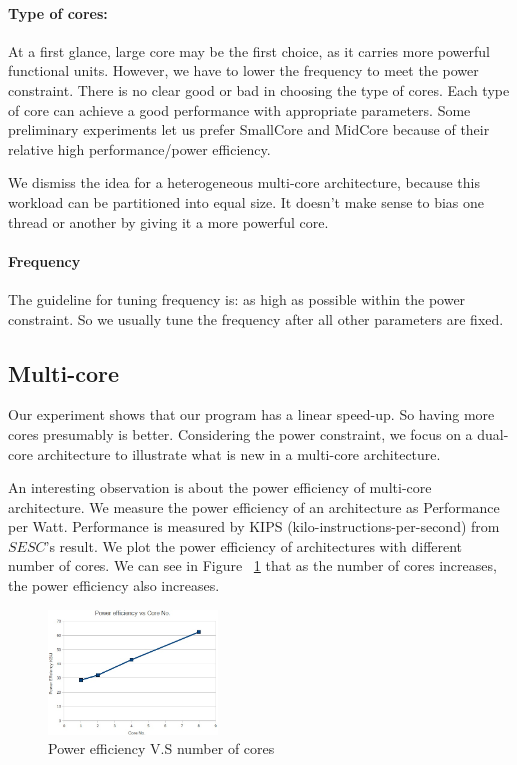 \documentclass[twocolumn,letterpaper,10pt]{article}
\begin{document}
\paragraph{Type of cores:} At a first glance, large core may be the
first choice, as it carries more powerful functional units. However,
we have to lower the frequency to meet the power
constraint. There is no clear good or bad in choosing the type of
cores. Each type of core can achieve a good performance with
appropriate parameters. Some
preliminary experiments let us prefer SmallCore and MidCore because
of their relative high performance/power efficiency.

We dismiss the idea for a heterogeneous multi-core architecture,
because this workload can be partitioned into equal size. It
doesn't make sense to bias one thread or another by giving it a more
powerful core.

\paragraph{Frequency} The guideline for tuning frequency is: as
high as possible within the power constraint. So we usually tune the
frequency after all other parameters are fixed.

\subsection{Multi-core}
Our experiment shows
that our program has a linear speed-up. So having more
cores presumably is better. Considering the power constraint, we
focus on a dual-core architecture to illustrate what is new in
a multi-core architecture.

An interesting observation is about the power
efficiency of multi-core architecture. We measure the power efficiency of an architecture as Performance per
Watt. Performance is measured by KIPS (kilo-instructions-per-second)
from $SESC$'s result. We plot the power efficiency of architectures
with different number of cores. We can see in Figure ~\ref{fig:power} that as the number of cores
increases, the power efficiency also increases.

\begin{figure}[ht!]
\begin{center}
\includegraphics[width=0.4\textwidth]{figures/efficiency.jpg}
\end{center}
\caption{Power efficiency V.S number of cores}
\label{fig:power}
\end{figure}
\end{document}
